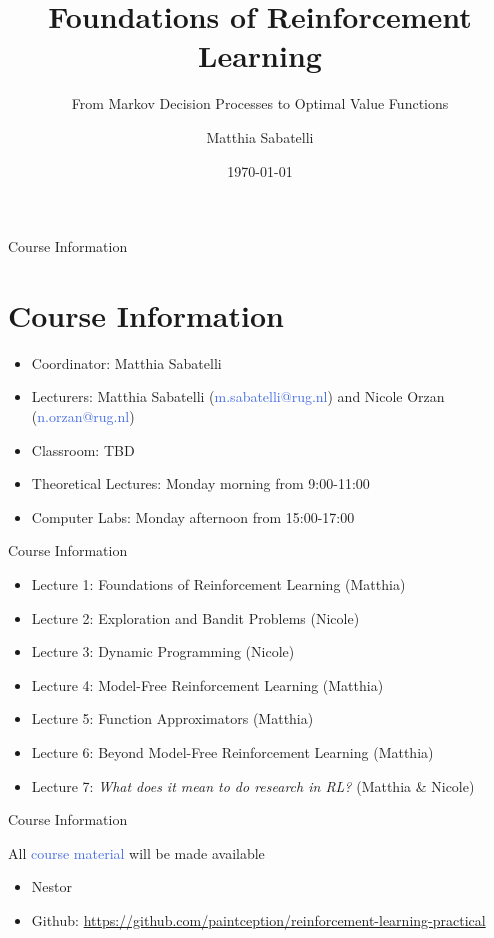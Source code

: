 \documentclass{beamer}
\title{Foundations of Reinforcement Learning}
\subtitle{From Markov Decision Processes to Optimal Value Functions}
\author{Matthia Sabatelli}
\date{\today}
\begin{document}
\frame{\titlepage} 


\begin{frame}{Course Information}
	\section{Course Information}

	\begin{itemize}
		\item Coordinator: Matthia Sabatelli
		\item Lecturers: Matthia Sabatelli (\textcolor{RoyalBlue}{m.sabatelli@rug.nl}) and Nicole Orzan (\textcolor{RoyalBlue}{n.orzan@rug.nl})
		\item Classroom: TBD
		\item Theoretical Lectures: Monday morning from 9:00-11:00
		\item Computer Labs: Monday afternoon from 15:00-17:00
	\end{itemize}

\end{frame}


\begin{frame}{Course Information}

	\begin{itemize}
		\item Lecture 1: Foundations of Reinforcement Learning (Matthia)
		\item Lecture 2: Exploration and Bandit Problems (Nicole)
		\item Lecture 3: Dynamic Programming (Nicole)
		\item Lecture 4: Model-Free Reinforcement Learning (Matthia)
		\item Lecture 5: Function Approximators (Matthia) 
		\item Lecture 6: Beyond Model-Free Reinforcement Learning (Matthia)
		\item Lecture 7: \textit{What does it mean to do research in RL?} (Matthia \& Nicole)
	\end{itemize}

\end{frame}

\begin{frame}{Course Information}

	All \textcolor{RoyalBlue}{course material} will be made available

	\begin{itemize}
		\item Nestor
		\item Github: \url{https://github.com/paintception/reinforcement-learning-practical}
	\end{itemize}

\end{frame}
\end{document}
